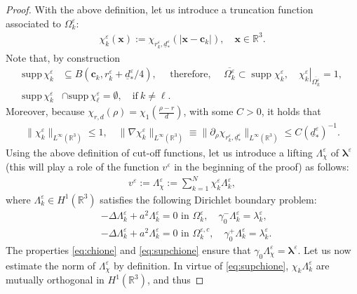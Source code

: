 \documentclass[10pt,a4paper]{amsart}
\newcommand{\re}{\varepsilon}
\renewcommand{\vec}{\boldsymbol}
\begin{document}
\begin{proof}
			With the above definition, let us introduce a truncation function associated to $\Omega^{\re}_k$:
			\begin{align*}%
				\chi_k^{\re}(\boldsymbol{x}) := \chi_{r^{\re}_k, \underline{d}^{\re}_*} (|\boldsymbol{x} - \boldsymbol{c}_k|), \quad \boldsymbol{x} \in \mathbb{R}^3.
			\end{align*}	 	
			Note that, by construction 
			\begin{align}
				\label{eq:chione}
				\text{supp} \,\chi_k^{\re} &\subseteq B(\boldsymbol{c}_k, r^{\re}_k+\underline{d}^{\re}_*/4),\quad \text{ therefore, }\quad\overline{\Omega^{\re}_k}\subset \operatorname{supp}\chi_k^{\re},
				\quad 
				\left.\chi_k^{\re}\right|_{\overline{\Omega^{\re}_k}}=1,\\
				\label{eq:supchione}
				\text{supp}\,\chi_k^{\re}&  \cap \text{supp}\,\chi_{\ell}^{\re} = \emptyset, \quad \text{if}~k \neq \ell.
			\end{align} 
			Moreover, because $\chi_{r,d}(\rho)=\chi_1\left(\frac{\rho-r}{d}\right)$, with some $C>0$, it holds that  
			\begin{align}
				\label{eq:bounds_on_cut_off}
				\| \chi_k^{\re} \|_{L^{\infty}(\mathbb{R}^3)} \leq 1, \quad \| \nabla \chi_k^{\re} \|_{L^{\infty}(\mathbb{R}^3)}\equiv \|\partial_{\rho}\chi_{r_k^{\re}, \underline{d}^{\re}_*}\|_{L^{\infty}(\mathbb{R}^3)} \leq C (\underline{d}^{\re}_*)^{-1}.	
			\end{align}
			Using the above definition of cut-off functions, let us introduce a lifting $\Lambda^{\re}_{\chi}$ of $\vec{\lambda}^{\re}$ (this will play a role of the function $v^{\re}$ in the beginning of the proof) as follows:
			\begin{align*}%
				v^{\re}:=\Lambda^{\re}_{\chi} := \sum_{k=1}^N \chi_k^{\re} \Lambda^{\re}_k,
			\end{align*}
			where $\Lambda^{\re}_k \in H^{1}(\mathbb{R}^3)$ satisfies the following Dirichlet boundary problem:
			\begin{align*}%
				&- \Delta \Lambda^{\re}_k + a^2  \Lambda^{\re}_k = 0 \text{ in } \Omega^{\re}_k, \quad  \gamma^{-}_0 \Lambda^{\re}_k = \lambda^{\re}_k, \\
				&- \Delta \Lambda^{\re}_k + a^2  \Lambda^{\re}_k = 0 \text{ in } \Omega^{\re, c}_k, \quad  \gamma^{+}_0 \Lambda^{\re}_k = \lambda^{\re}_k.
			\end{align*}
			The properties \eqref{eq:chione} and \eqref{eq:supchione} ensure that  $\gamma_0\Lambda_{\chi}^{\re}=\vec{\lambda}^{\re}$. Let us now estimate the norm of $\Lambda^{\re}_{\chi}$ by definition. In virtue of \eqref{eq:supchione}, $\chi_k\Lambda^{\re}_k$ are mutually orthogonal in $H^1(\mathbb{R}^3)$, and thus 

\end{proof}
\end{document}
